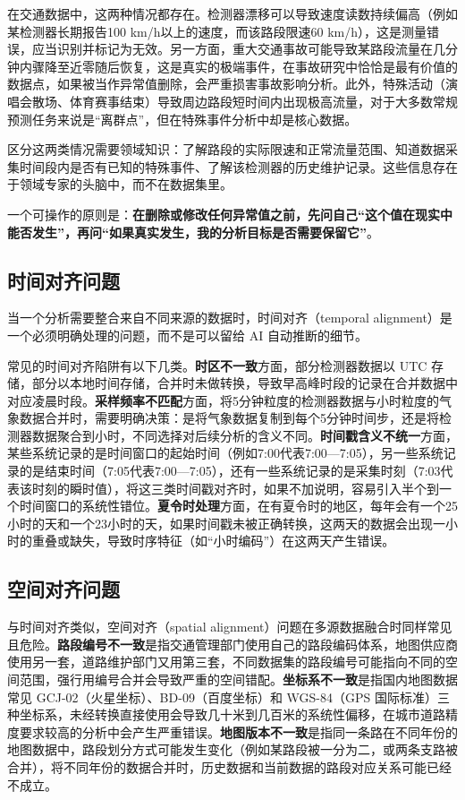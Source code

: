 在交通数据中，这两种情况都存在。检测器漂移可以导致速度读数持续偏高（例如某检测器长期报告100 km/h以上的速度，而该路段限速60 km/h），这是测量错误，应当识别并标记为无效。另一方面，重大交通事故可能导致某路段流量在几分钟内骤降至近零随后恢复，这是真实的极端事件，在事故研究中恰恰是最有价值的数据点，如果被当作异常值删除，会严重损害事故影响分析。此外，特殊活动（演唱会散场、体育赛事结束）导致周边路段短时间内出现极高流量，对于大多数常规预测任务来说是“离群点”，但在特殊事件分析中却是核心数据。

区分这两类情况需要领域知识：了解路段的实际限速和正常流量范围、知道数据采集时间段内是否有已知的特殊事件、了解该检测器的历史维护记录。这些信息存在于领域专家的头脑中，而不在数据集里。

一个可操作的原则是：\textbf{在删除或修改任何异常值之前，先问自己“这个值在现实中能否发生”，再问“如果真实发生，我的分析目标是否需要保留它”}。

\subsection{时间对齐问题}

当一个分析需要整合来自不同来源的数据时，时间对齐（temporal alignment）是一个必须明确处理的问题，而不是可以留给 AI 自动推断的细节。

常见的时间对齐陷阱有以下几类。\textbf{时区不一致}方面，部分检测器数据以 UTC 存储，部分以本地时间存储，合并时未做转换，导致早高峰时段的记录在合并数据中对应凌晨时段。\textbf{采样频率不匹配}方面，将5分钟粒度的检测器数据与小时粒度的气象数据合并时，需要明确决策：是将气象数据复制到每个5分钟时间步，还是将检测器数据聚合到小时，不同选择对后续分析的含义不同。\textbf{时间戳含义不统一}方面，某些系统记录的是时间窗口的起始时间（例如7:00代表7:00—7:05），另一些系统记录的是结束时间（7:05代表7:00—7:05），还有一些系统记录的是采集时刻（7:03代表该时刻的瞬时值），将这三类时间戳对齐时，如果不加说明，容易引入半个到一个时间窗口的系统性错位。\textbf{夏令时处理}方面，在有夏令时的地区，每年会有一个25小时的天和一个23小时的天，如果时间戳未被正确转换，这两天的数据会出现一小时的重叠或缺失，导致时序特征（如“小时编码”）在这两天产生错误。

\subsection{空间对齐问题}

与时间对齐类似，空间对齐（spatial alignment）问题在多源数据融合时同样常见且危险。\textbf{路段编号不一致}是指交通管理部门使用自己的路段编码体系，地图供应商使用另一套，道路维护部门又用第三套，不同数据集的路段编号可能指向不同的空间范围，强行用编号合并会导致严重的空间错配。\textbf{坐标系不一致}是指国内地图数据常见 GCJ-02（火星坐标）、BD-09（百度坐标）和 WGS-84（GPS 国际标准）三种坐标系，未经转换直接使用会导致几十米到几百米的系统性偏移，在城市道路精度要求较高的分析中会产生严重错误。\textbf{地图版本不一致}是指同一条路在不同年份的地图数据中，路段划分方式可能发生变化（例如某路段被一分为二，或两条支路被合并），将不同年份的数据合并时，历史数据和当前数据的路段对应关系可能已经不成立。

